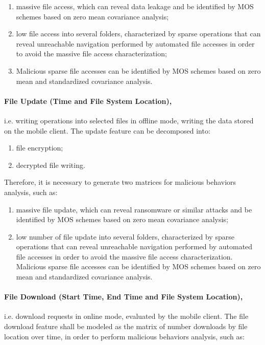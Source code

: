 \documentclass[twocolumn]{svjour3}          	%
\begin{document}
\begin{enumerate}[label=(\alph*)]
	\item massive file access, which can reveal data leakage and be identified by MOS schemes based on zero mean covariance analysis; 
	\item low file access into several folders, characterized by sparse operations that can reveal unreachable navigation performed by automated file accesses in order to avoid the massive file access characterization;
	\item Malicious sparse file accesses can be identified by MOS schemes based on zero mean and standardized covariance analysis. 
\end{enumerate}

\paragraph{\textbf{File Update (Time and File System Location)},}i.e. writing operations into selected files in offline mode, writing the data stored on the mobile client. The update feature can be decomposed into:

\begin{enumerate}
	\item file encryption;
	\item decrypted file writing.
\end{enumerate}

Therefore, it is necessary to generate two matrices for malicious behaviors analysis, such as: 

\begin{enumerate}[label=(\alph*)]
	\item massive file update, which can reveal ransomware or similar attacks and be identified by MOS schemes based on zero mean covariance analysis; 
	\item low number of file update into several folders, characterized by sparse operations that can reveal unreachable navigation performed by automated file accesses in order to avoid the massive file access characterization. Malicious sparse file accesses can be identified by MOS schemes based on zero mean and standardized covariance analysis.
\end{enumerate}

\paragraph{\textbf{File Download (Start Time, End Time and File System Location)},}i.e. download requests in online mode, evaluated by the mobile client. The file download feature shall be modeled as the matrix of number downloads by file location over time, in order to perform malicious behaviors analysis, such as:
\end{document}
